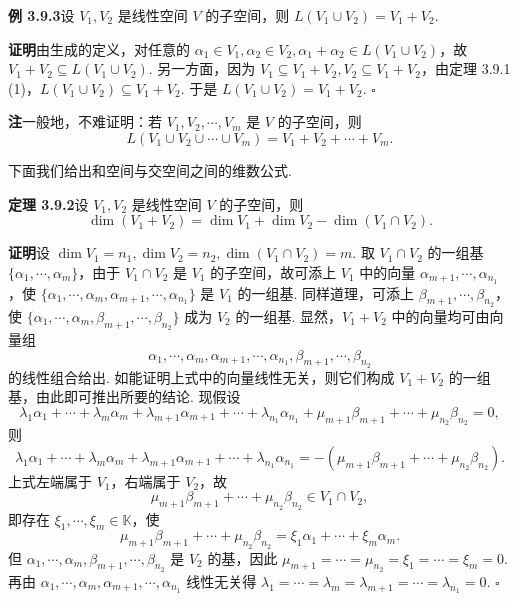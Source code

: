 \documentclass[UTF8,12pt,a4paper,fontset=fandol]{ctexart}
\begin{document}
\noindent\textbf{例 3.9.3}\quad 设 $V_1,V_2$ 是线性空间 $V$ 的子空间，则 $L(V_1\cup V_2)=V_1+V_2$.

\noindent\textbf{证明}\quad 由生成的定义，对任意的 $\alpha_1\in V_1,\alpha_2\in V_2,\alpha_1+\alpha_2\in L(V_1\cup V_2)$，故 $V_1+V_2\subseteq L(V_1\cup V_2)$. 另一方面，因为 $V_1\subseteq V_1+V_2,V_2\subseteq V_1+V_2$，由定理 3.9.1 (1)，$L(V_1\cup V_2)\subseteq V_1+V_2$. 于是 $L(V_1\cup V_2)=V_1+V_2$. $\square$

\noindent\textbf{注}\quad 一般地，不难证明：若 $V_1,V_2,\cdots,V_m$ 是 $V$ 的子空间，则
\[
L(V_1\cup V_2\cup\cdots\cup V_m)=V_1+V_2+\cdots+V_m.
\]

下面我们给出和空间与交空间之间的维数公式.

\noindent\textbf{定理 3.9.2}\quad 设 $V_1,V_2$ 是线性空间 $V$ 的子空间，则
\begin{equation}
\dim(V_1+V_2)=\dim V_1+\dim V_2-\dim(V_1\cap V_2).
\tag{3.9.1}
\end{equation}

\noindent\textbf{证明}\quad 设 $\dim V_1=n_1,\dim V_2=n_2,\dim(V_1\cap V_2)=m$. 取 $V_1\cap V_2$ 的一组基 $\{\alpha_1,\cdots,\alpha_m\}$，由于 $V_1\cap V_2$ 是 $V_1$ 的子空间，故可添上 $V_1$ 中的向量 $\alpha_{m+1},\cdots,\alpha_{n_1}$，使 $\{\alpha_1,\cdots,\alpha_m,\alpha_{m+1},\cdots,\alpha_{n_1}\}$ 是 $V_1$ 的一组基. 同样道理，可添上 $\beta_{m+1},\cdots,\beta_{n_2}$，使 $\{\alpha_1,\cdots,\alpha_m,\beta_{m+1},\cdots,\beta_{n_2}\}$ 成为 $V_2$ 的一组基. 显然，$V_1+V_2$ 中的向量均可由向量组
\begin{equation}
\alpha_1,\cdots,\alpha_m,\alpha_{m+1},\cdots,\alpha_{n_1},\beta_{m+1},\cdots,\beta_{n_2}
\tag{3.9.2}
\end{equation}
的线性组合给出. 如能证明上式中的向量线性无关，则它们构成 $V_1+V_2$ 的一组基，由此即可推出所要的结论. 现假设
\[
\lambda_1\alpha_1+\cdots+\lambda_m\alpha_m+\lambda_{m+1}\alpha_{m+1}+\cdots+\lambda_{n_1}\alpha_{n_1}+\mu_{m+1}\beta_{m+1}+\cdots+\mu_{n_2}\beta_{n_2}=0,
\]
则
\[
\lambda_1\alpha_1+\cdots+\lambda_m\alpha_m+\lambda_{m+1}\alpha_{m+1}+\cdots+\lambda_{n_1}\alpha_{n_1}=-(\mu_{m+1}\beta_{m+1}+\cdots+\mu_{n_2}\beta_{n_2}).
\]
上式左端属于 $V_1$，右端属于 $V_2$，故
\[
\mu_{m+1}\beta_{m+1}+\cdots+\mu_{n_2}\beta_{n_2}\in V_1\cap V_2,
\]
即存在 $\xi_1,\cdots,\xi_m\in\mathbb{K}$，使
\[
\mu_{m+1}\beta_{m+1}+\cdots+\mu_{n_2}\beta_{n_2}=\xi_1\alpha_1+\cdots+\xi_m\alpha_m.
\]
但 $\alpha_1,\cdots,\alpha_m,\beta_{m+1},\cdots,\beta_{n_2}$ 是 $V_2$ 的基，因此 $\mu_{m+1}=\cdots=\mu_{n_2}=\xi_1=\cdots=\xi_m=0$. 再由 $\alpha_1,\cdots,\alpha_m,\alpha_{m+1},\cdots,\alpha_{n_1}$ 线性无关得 $\lambda_1=\cdots=\lambda_m=\lambda_{m+1}=\cdots=\lambda_{n_1}=0$. $\square$
\end{document}
